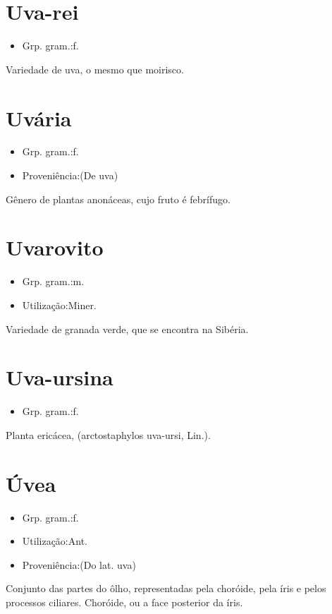 \documentclass{article}
\begin{document}
\section{Uva-rei}
\begin{itemize}
\item {Grp. gram.:f.}
\end{itemize}
Variedade de uva, o mesmo que \textunderscore moirisco\textunderscore .
\section{Uvária}
\begin{itemize}
\item {Grp. gram.:f.}
\end{itemize}
\begin{itemize}
\item {Proveniência:(De \textunderscore uva\textunderscore )}
\end{itemize}
Gênero de plantas anonáceas, cujo fruto é febrífugo.
\section{Uvarovito}
\begin{itemize}
\item {Grp. gram.:m.}
\end{itemize}
\begin{itemize}
\item {Utilização:Miner.}
\end{itemize}
Variedade de granada verde, que se encontra na Sibéria.
\section{Uva-ursina}
\begin{itemize}
\item {Grp. gram.:f.}
\end{itemize}
Planta ericácea, (\textunderscore arctostaphylos uva-ursi\textunderscore , Lin.).
\section{Úvea}
\begin{itemize}
\item {Grp. gram.:f.}
\end{itemize}
\begin{itemize}
\item {Utilização:Ant.}
\end{itemize}
\begin{itemize}
\item {Proveniência:(Do lat. \textunderscore uva\textunderscore )}
\end{itemize}
Conjunto das partes do ôlho, representadas pela choróide, pela íris e pelos processos ciliares.
Choróide, ou a face posterior da íris.
\end{document}
